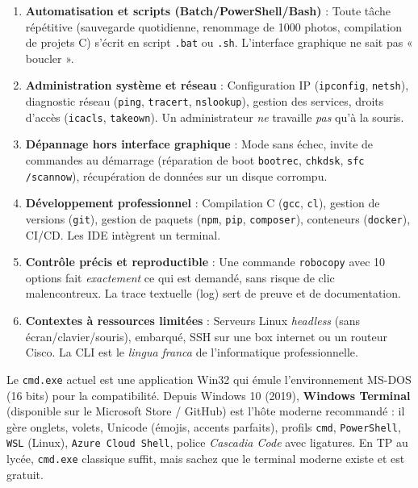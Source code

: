 \documentclass[11pt]{article}
\begin{document}
\begin{aretenir}
\begin{enumerate}
    \item \textbf{Automatisation et scripts (Batch/PowerShell/Bash)} : Toute tâche répétitive (sauvegarde quotidienne, renommage de 1000 photos, compilation de projets C) s'écrit en script \texttt{.bat} ou \texttt{.sh}. L'interface graphique ne sait pas « boucler ».
    \item \textbf{Administration système et réseau} : Configuration IP (\texttt{ipconfig}, \texttt{netsh}), diagnostic réseau (\texttt{ping}, \texttt{tracert}, \texttt{nslookup}), gestion des services, droits d'accès (\texttt{icacls}, \texttt{takeown}). Un administrateur \emph{ne} travaille \emph{pas} qu'à la souris.
    \item \textbf{Dépannage hors interface graphique} : Mode sans échec, invite de commandes au démarrage (réparation de boot \texttt{bootrec}, \texttt{chkdsk}, \texttt{sfc /scannow}), récupération de données sur un disque corrompu.
    \item \textbf{Développement professionnel} : Compilation C (\texttt{gcc}, \texttt{cl}), gestion de versions (\texttt{git}), gestion de paquets (\texttt{npm}, \texttt{pip}, \texttt{composer}), conteneurs (\texttt{docker}), CI/CD. Les IDE intègrent un terminal.
    \item \textbf{Contrôle précis et reproductible} : Une commande \texttt{robocopy} avec 10 options fait \emph{exactement} ce qui est demandé, sans risque de clic malencontreux. La trace textuelle (log) sert de preuve et de documentation.
    \item \textbf{Contextes à ressources limitées} : Serveurs Linux \emph{headless} (sans écran/clavier/souris), embarqué, SSH sur une box internet ou un routeur Cisco. La CLI est le \emph{lingua franca} de l'informatique professionnelle.
\end{enumerate}
\end{aretenir}

\begin{savaistu}
Le \texttt{cmd.exe} actuel est une application Win32 qui émule l'environnement MS-DOS (16 bits) pour la compatibilité. Depuis Windows 10 (2019), \textbf{Windows Terminal} (disponible sur le Microsoft Store / GitHub) est l'hôte moderne recommandé : il gère onglets, volets, Unicode (émojis, accents parfaits), profils \texttt{cmd}, \texttt{PowerShell}, \texttt{WSL} (Linux), \texttt{Azure Cloud Shell}, police \emph{Cascadia Code} avec ligatures. En TP au lycée, \texttt{cmd.exe} classique suffit, mais sachez que le terminal moderne existe et est gratuit.
\end{savaistu}
\end{document}

